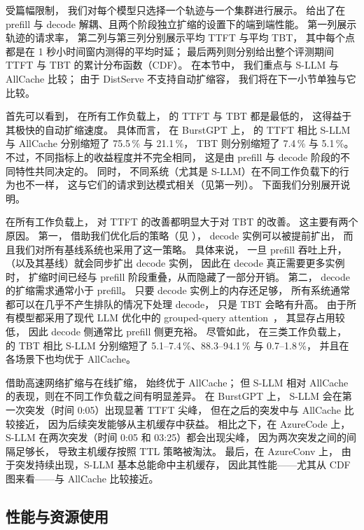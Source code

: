 \noindent
受篇幅限制，
我们对每个模型只选择一个轨迹与一个集群进行展示。
{} 给出了在 prefill 与 decode 解耦、且两个阶段独立扩缩的设置下的端到端性能。
第一列展示轨迹的请求率，
第二列与第三列分别展示平均 TTFT 与平均 TBT，
其中每个点都是在 1 秒小时间窗内测得的平均时延；
最后两列则分别给出整个评测期间 TTFT 与 TBT 的累计分布函数（CDF）。
在本节中，
我们重点与 S-LLM 与 AllCache 比较；
由于 DistServe 不支持自动扩缩容，
我们将在下一小节单独与它比较。

首先可以看到，
在所有工作负载上，{\sys} 的 TTFT 与 TBT 都是最低的，
这得益于其极快的自动扩缩速度。
具体而言，
在 BurstGPT 上，
{\sys} 的 TTFT 相比 S-LLM 与 AllCache 分别缩短了 75.5\,\% 与 21.1\,\%，
TBT 则分别缩短了 7.4\,\% 与 5.1\,\%。
不过，不同指标上的收益程度并不完全相同，
这是由 prefill 与 decode 阶段的不同特性共同决定的。
同时，
不同系统（尤其是 S-LLM）在不同工作负载下的行为也不一样，
这与它们的请求到达模式相关（见第一列）。
下面我们分别展开说明。

在所有工作负载上，
{\sys} 对 TTFT 的改善都明显大于对 TBT 的改善。
这主要有两个原因。
第一，
借助我们优化后的策略（见 \textsection{\ref{sec:design-llm}}），
decode 实例可以被提前扩出，
而且我们对所有基线系统也采用了这一策略。
具体来说，
一旦 prefill 吞吐上升，
{\sys}（以及其基线）就会同步扩出 decode 实例，
因此在 decode 真正需要更多实例时，
扩缩时间已经与 prefill 阶段重叠，从而隐藏了一部分开销。
第二，
decode 的扩缩需求通常小于 prefill。
只要 decode 实例上的内存还足够，
所有系统通常都可以在几乎不产生排队的情况下处理 decode，
只是 TBT 会略有升高。
由于所有模型都采用了现代 LLM 优化中的 grouped-query attention~\cite{gqa}，
其显存占用较低，
因此 decode 侧通常比 prefill 侧更充裕。
尽管如此，
在三类工作负载上，{\sys} 的 TBT 相比 S-LLM 分别缩短了 5.1--7.4\,\%、88.3--94.1\,\% 与 0.7--1.8\,\%，
并且在各场景下也均优于 AllCache。

借助高速网络扩缩与在线扩缩，
{\sys} 始终优于 AllCache；
但 S-LLM 相对 AllCache 的表现，则在不同工作负载之间有明显差异。
在 BurstGPT 上，
S-LLM 会在第一次突发（时间 0:05）出现显著 TTFT 尖峰，
但在之后的突发中与 AllCache 比较接近，
因为后续突发能够从主机缓存中获益。
相比之下，在 AzureCode 上，
S-LLM 在两次突发（时间 0:05 和 03:25）都会出现尖峰，
因为两次突发之间的间隔足够长，
导致主机缓存按照 TTL 策略被淘汰。
最后，在 AzureConv 上，
由于突发持续出现，S-LLM 基本总能命中主机缓存，
因此其性能——尤其从 CDF 图来看——与 AllCache 比较接近。

\subsection{性能与资源使用}
\label{sec:eval-resource}

